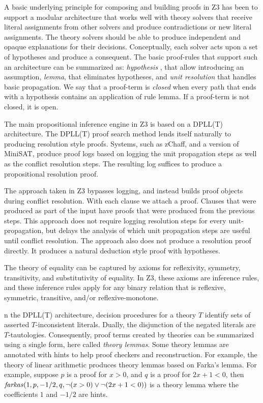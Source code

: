 \documentclass{llncs}
\begin{document}
A basic underlying principle for composing and building proofs in Z3 has been to support a modular
architecture that works well with theory solvers that receive literal assignments from other solvers and
produce contradictions or new literal assignments. The theory solvers should be able to produce independent
and opaque explanations for their decisions.
Conceptually, each solver acts upon a set of hypotheses and produce a consequent. The basic proof-rules
that support such an architecture can be summarized as: \emph{hypothesis} , that allow introducing an
assumption, \emph{lemma}, that eliminates hypotheses, and \emph{unit resolution} that handles basic propagation.
We say that a proof-term is \emph{closed} when every path that ends with a hypothesis contains an application
of rule lemma. If a proof-term is not closed, it is open.

The main propositional inference engine in Z3 is based on a DPLL(T) architecture.
The DPLL(T) proof search method lends itself naturally to producing resolution style proofs.
Systems, such as zChaff, and a version of MiniSAT, produce proof logs based on logging the
unit propagation steps as well as the conflict resolution steps. The resulting log suffices to produce a
propositional resolution proof.

The approach taken in Z3 bypasses logging, and instead builds proof
objects during conflict resolution.  With each clause we attach a
proof. Clauses that were produced as part of the input have proofs
that were produced from the previous steps. This approach does not
require logging resolution steps for every unit-propagation, but
delays the analysis of which unit propagation steps are useful until
conflict resolution. The approach also does not produce a resolution
proof directly. It produces a natural deduction style proof with
hypotheses.

The theory of equality can be captured by axioms for reflexivity,
symmetry, transitivity, and substitutivity of equality. In Z3,
these axioms are inference rules, and these inference rules apply
for any binary relation that is reflexive,
symmetric, transitive, and/or reflexive-monotone.

n the DPLL(T) architecture, decision procedures for a theory $T$
identify sets of asserted $T$-inconsistent literals. Dually, the
disjunction of the negated literals are $T$-tautologies. Consequently,
proof terms created by theories can be summarized using a single form,
here called \emph{theory lemmas}. Some theory lemmas are annotated
with hints to help proof checkers and reconstruction. For example, the
theory of linear arithmetic produces theory lemmas based on Farka's
lemma. For example, suppose $p$ is a proof for $x > 0$, and $q$ is a
proof for $2x + 1 < 0$, then $\mbox{\emph{farkas}}(1, p, -1/2, q, \neg(x > 0) \vee \neg(2x + 1 < 0))$
is a theory lemma where the coefficients $1$ and $-1/2$ are hints.
\end{document}
